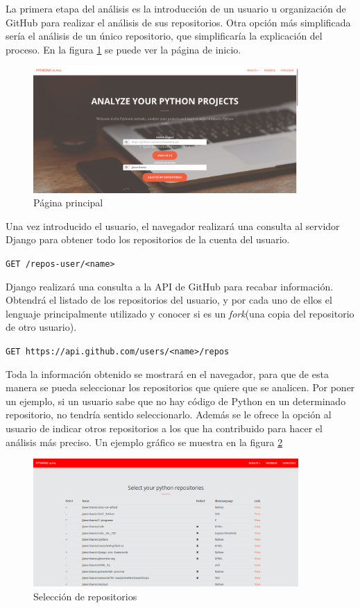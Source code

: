 \documentclass[a4paper, 12pt]{book}
\begin{document}
La primera etapa del análisis es la introducción de un usuario u organización de GitHub para realizar el análisis de sus repositorios. Otra opción más simplificada sería el análisis de un único repositorio, que simplificaría la explicación del proceso. En la figura \ref{fig:inicio} se puede ver la página de inicio. 

\begin{figure}[H]
    \centering
    \includegraphics[width=0.9\textwidth]{img/1inicio.png}
    \caption{Página principal}
    \label{fig:inicio}
\end{figure}

Una vez introducido el usuario, el navegador realizará una consulta al servidor Django para obtener todo los repositorios de la cuenta del usuario. 

\texttt{GET /repos-user/<name>}

Django realizará una consulta a la API de GitHub para recabar información. Obtendrá el listado de los repositorios del usuario, y por cada uno de ellos el lenguaje principalmente utilizado y conocer si es un \textit{fork}(una copia del repositorio de otro usuario).

\texttt{GET https://api.github.com/users/<name>/repos}

Toda la información obtenido se mostrará en el navegador, para que de esta manera se pueda seleccionar los repositorios que quiere que se analicen. Por poner un ejemplo, si un usuario sabe que no hay código de Python en un determinado repositorio, no tendría sentido seleccionarlo. Además se le ofrece la opción al usuario de indicar otros repositorios a los que ha contribuido para hacer el análisis más preciso. Un ejemplo gráfico se muestra en la figura \ref{fig:pediruser}

\begin{figure}[H]
    \centering
    \includegraphics[width=0.9\textwidth]{img/1seleccionar.png}
    \caption{Selección de repositorios}
    \label{fig:pediruser}
\end{figure}
\end{document}
